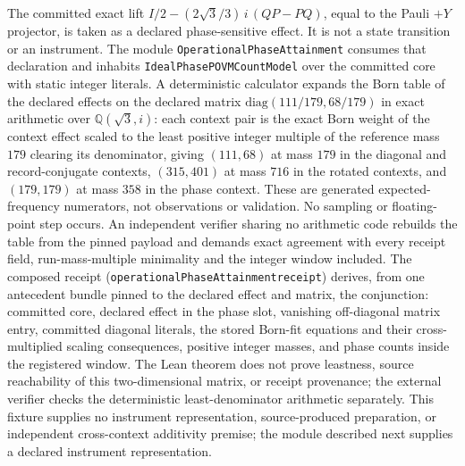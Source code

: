 \documentclass[11pt]{article}
\renewcommand{\_}{\textunderscore\allowbreak}
\theoremstyle{remark}
\begin{document}
The committed exact lift
$I/2 - (2\sqrt{3}/3)\,i\,(QP - PQ)$, equal to the Pauli $+Y$ projector, is taken
as a declared phase-sensitive effect. It is not a state transition or an
instrument. The module \texttt{OperationalPhaseAttainment} consumes that
declaration and inhabits \texttt{IdealPhasePOVMCountModel} over the committed
core with static integer literals. A deterministic calculator expands the
Born table of the declared effects on the declared matrix
$\mathrm{diag}(111/179, 68/179)$ in exact arithmetic over
$\mathbb{Q}(\sqrt{3}, i)$: each context pair is the exact Born weight of the
context effect scaled to the least positive integer multiple of the reference
mass $179$ clearing its denominator, giving
$(111, 68)$ at mass $179$ in the diagonal and record-conjugate contexts,
$(315, 401)$ at mass $716$ in the rotated contexts, and $(179, 179)$ at mass
$358$ in the phase context. These are generated expected-frequency
numerators, not observations or validation. No sampling or floating-point
step occurs. An independent verifier sharing no arithmetic code rebuilds the table
from the pinned payload and demands exact agreement with every receipt
field, run-mass-multiple minimality and the integer window included. The
composed receipt (\texttt{operationalPhaseAttainment\_receipt}) derives,
from one antecedent bundle pinned to the declared effect and matrix, the
conjunction: committed core, declared effect in the phase slot, vanishing
off-diagonal matrix entry, committed diagonal literals, the stored Born-fit
equations and their cross-multiplied scaling consequences, positive integer
masses, and phase counts inside the registered window. The Lean theorem does
not prove leastness, source reachability of this two-dimensional matrix, or
receipt provenance; the external verifier checks the deterministic
least-denominator arithmetic separately. This fixture supplies no instrument
representation, source-produced preparation, or independent cross-context
additivity premise; the module described next supplies a declared instrument
representation.
\end{document}
